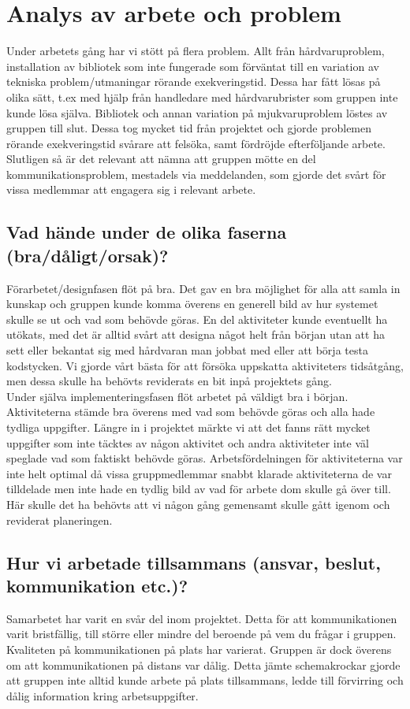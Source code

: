 \documentclass[10pt,oneside,swedish]{lips}
\begin{document}
\section{Analys av arbete och problem}
Under arbetets gång har vi stött på flera problem. Allt från hårdvaruproblem, installation av bibliotek som inte fungerade som förväntat till en variation av tekniska problem/utmaningar rörande exekveringstid. Dessa har fått lösas på olika sätt, t.ex med hjälp från handledare med hårdvarubrister som gruppen inte kunde lösa själva. Bibliotek och annan variation på mjukvaruproblem löstes av gruppen till slut. Dessa tog mycket tid från projektet och gjorde problemen rörande exekveringstid svårare att felsöka, samt fördröjde efterföljande arbete. Slutligen så är det relevant att nämna att gruppen mötte en del kommunikationsproblem, mestadels via meddelanden, som gjorde det svårt för vissa medlemmar att engagera sig i relevant arbete.

\subsection{Vad hände under de olika faserna (bra/dåligt/orsak)?}
Förarbetet/designfasen flöt på bra. Det gav en bra möjlighet för alla att samla in kunskap och gruppen kunde komma överens en generell bild av hur systemet skulle se ut och vad som behövde göras. En del aktiviteter kunde eventuellt ha utökats, med det är alltid svårt att designa något helt från början utan att ha sett eller bekantat sig med hårdvaran man jobbat med eller att börja testa kodstycken. Vi gjorde vårt bästa för att försöka uppskatta aktiviteters tidsåtgång, men dessa skulle ha behövts reviderats en bit inpå projektets gång.\\

\noindent
Under själva implementeringsfasen flöt arbetet på väldigt bra i början. Aktiviteterna stämde bra överens med vad som behövde göras och alla hade tydliga uppgifter. Längre in i projektet märkte vi att det fanns rätt mycket uppgifter som inte täcktes av någon aktivitet och andra aktiviteter inte väl speglade vad som faktiskt behövde göras. Arbetsfördelningen för aktiviteterna var inte helt optimal då vissa gruppmedlemmar snabbt klarade aktiviteterna de var tilldelade men inte hade en tydlig bild av vad för arbete dom skulle gå över till.
Här skulle det ha behövts att vi någon gång gemensamt skulle gått igenom och reviderat planeringen. 

\subsection{Hur vi arbetade tillsammans (ansvar, beslut, kommunikation etc.)?}
Samarbetet har varit en svår del inom projektet. Detta för att kommunikationen varit bristfällig, till större eller mindre del beroende på vem du frågar i gruppen. Kvaliteten på kommunikationen på plats har varierat. Gruppen är dock överens om att kommunikationen på distans var dålig. Detta jämte schemakrockar gjorde att gruppen inte alltid kunde arbete på plats tillsammans, ledde till förvirring och dålig information kring arbetsuppgifter. \\
\end{document}
